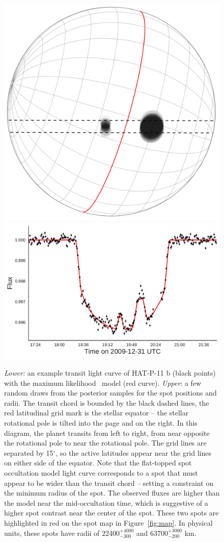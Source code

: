 \begin{figure}
\centering
\includegraphics[scale=0.2]{stsp_hat_p_11/transit044.pdf}
\includegraphics[scale=0.4]{stsp_hat_p_11/lc_044.pdf}
\caption{\textit{Lower:} an example transit light curve of HAT-P-11 b (black points) with the maximum likelihood \stsp\ model (red curve). \textit{Upper}: a few random draws from the posterior samples for the spot positions and radii. The transit chord is bounded by the black dashed lines, the red latitudinal grid mark is the stellar equator -- the stellar rotational pole is tilted into the page and on the right. In this diagram, the planet transits from left to right, from near opposite the rotational pole to near the rotational pole. The grid lines are separated by 15$^\circ$, so the active latitudes appear near the grid lines on either side of the equator. Note that the flat-topped spot occultation model light curve corresponds to a spot that must appear to be wider than the transit chord -- setting a constraint on the minimum radius of the spot. The observed fluxes are higher than the model near the mid-occultation time, which is suggestive of a higher spot contrast near the center of the spot. These two spots are highlighted in red on the spot map in Figure~\ref{fig:map}. In physical units, these spots have radii of $22400^{+4000}_{-300}$ and $63700^{+3000}_{-200}$ km.}

\end{figure}
